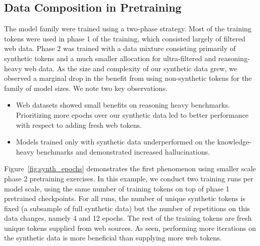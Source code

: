 \begin{table}[]
    \centering
{}
    \caption{Pretraining benchmarks for \model compared to its predecessor, \phithree{}-medium after pretraining.}
    \label{tab:phi3_versus_phi4}
\end{table}

\subsection{Data Composition in Pretraining}\label{sec:data_comp}

The \phithree{} model family were trained using a two-phase strategy. Most of the training tokens were used in phase 1 of the training, which consisted largely of filtered web data. Phase 2 was trained with a data mixture consisting primarily of synthetic tokens and a much smaller allocation for ultra-filtered and reasoning-heavy web data. As the size and complexity of our synthetic data grew, we observed a marginal drop in the benefit from using non-synthetic tokens for the \phithree{} family of model sizes. We note two key observations.
\begin{itemize}
    \item Web datasets showed small benefits on reasoning heavy benchmarks. Prioritizing more epochs over our synthetic data led to better performance with respect to adding fresh web tokens. 
    \item Models trained only with synthetic data underperformed on the knowledge-heavy benchmarks and demonstrated increased hallucinations. 
\end{itemize}

Figure~\ref{fig:synth_epochs} demonstrates the first phenomenon using smaller scale phase 2 pretraining exercises. In this example, we conduct two training runs per model scale, using the same number of training tokens on top of phase 1 pretrained checkpoints. For all runs, the number of unique synthetic tokens is fixed (a subsample of full synthetic data) but the number of repetitions on this data changes, namely 4 and 12 epochs. The rest of the training tokens are fresh unique tokens supplied from web sources. As seen, performing more iterations on the synthetic data is more beneficial than supplying more web tokens.

